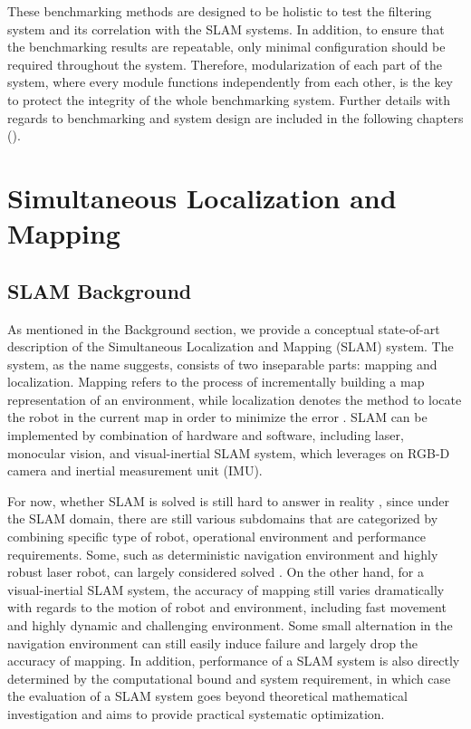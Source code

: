 These benchmarking methods are designed to be holistic to test the filtering system and its correlation with the SLAM systems. 
In addition, to ensure that the benchmarking results are repeatable, only minimal configuration should be required throughout the system. 
Therefore, modularization of each part of the system, where every module functions independently from each other, is the key to protect the integrity of the whole benchmarking system. 
Further details with regards to benchmarking and system design are included in the following chapters ().


\section{Simultaneous Localization and Mapping}
\subsection{SLAM Background}
As mentioned in the Background section, we provide a conceptual state-of-art description of the Simultaneous Localization and Mapping (SLAM) system. 
The system, as the name suggests, consists of two inseparable parts: mapping and localization. 
Mapping refers to the process of incrementally building a map representation of an environment, while localization denotes the method to locate the robot in the current map in order to minimize the error \cite{perera2014exploration}.
SLAM can be implemented by combination of hardware and software, including laser, monocular vision, and visual-inertial SLAM system, which leverages on RGB-D camera and inertial measurement unit (IMU).

For now, whether SLAM is solved is still hard to answer in reality \cite{frese2010interview}, since under the SLAM domain, there are still various subdomains that are categorized by combining specific type of robot, operational environment and performance requirements. 
Some, such as deterministic navigation environment and highly robust laser robot, can largely considered solved \cite{roboticskuka}. 
On the other hand, for a visual-inertial SLAM system, the accuracy of mapping still varies dramatically with regards to the motion of robot and environment, including fast movement and highly dynamic and challenging environment. 
Some small alternation in the navigation environment can still easily induce failure and largely drop the accuracy of mapping. 
In addition, performance of a SLAM system is also directly determined by the computational bound and system requirement, in which case the evaluation of a SLAM system goes beyond theoretical mathematical investigation and aims to provide practical systematic optimization.

